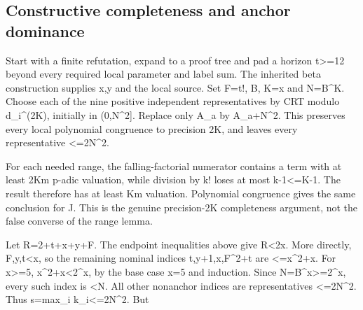 \subsection{Constructive completeness and anchor dominance}



Start with a finite refutation, expand to a proof tree and pad a horizon t\textgreater{}\allowbreak{}=\allowbreak{}12 beyond every required local parameter and label sum. The inherited beta construction supplies x,y and the local source. Set F=\allowbreak{}t!, B, K=\allowbreak{}x and N=\allowbreak{}B\textasciicircum{}\allowbreak{}K. Choose each of the nine positive independent representatives by CRT modulo d\_\allowbreak{}i\textasciicircum{}\allowbreak{}(2K), initially in (0,N\textasciicircum{}\allowbreak{}2]. Replace only A\_\allowbreak{}a by A\_\allowbreak{}a+\allowbreak{}N\textasciicircum{}\allowbreak{}2. This preserves every local polynomial congruence to precision 2K, and leaves every representative \textless{}\allowbreak{}=\allowbreak{}2N\textasciicircum{}\allowbreak{}2.



For each needed range, the falling-factorial numerator contains a term with at least 2Km p-adic valuation, while division by k! loses at most k-1\textless{}\allowbreak{}=\allowbreak{}K-1. The result therefore has at least Km valuation. Polynomial congruence gives the same conclusion for J. This is the genuine precision-2K completeness argument, not the false converse of the range lemma.



Let R=\allowbreak{}2+\allowbreak{}t+\allowbreak{}x+\allowbreak{}y+\allowbreak{}F. The endpoint inequalities above give R\textless{}\allowbreak{}2x. More directly, F,y,t\textless{}\allowbreak{}x, so the remaining nominal indices t,y+\allowbreak{}1,x,F\textasciicircum{}\allowbreak{}2+\allowbreak{}t are \textless{}\allowbreak{}=\allowbreak{}x\textasciicircum{}\allowbreak{}2+\allowbreak{}x. For x\textgreater{}\allowbreak{}=\allowbreak{}5, x\textasciicircum{}\allowbreak{}2+\allowbreak{}x\textless{}\allowbreak{}2\textasciicircum{}\allowbreak{}x, by the base case x=\allowbreak{}5 and induction. Since N=\allowbreak{}B\textasciicircum{}\allowbreak{}x\textgreater{}\allowbreak{}=\allowbreak{}2\textasciicircum{}\allowbreak{}x, every such index is \textless{}\allowbreak{}N. All other nonanchor indices are representatives \textless{}\allowbreak{}=\allowbreak{}2N\textasciicircum{}\allowbreak{}2. Thus s=\allowbreak{}max\_\allowbreak{}i k\_\allowbreak{}i\textless{}\allowbreak{}=\allowbreak{}2N\textasciicircum{}\allowbreak{}2. But



